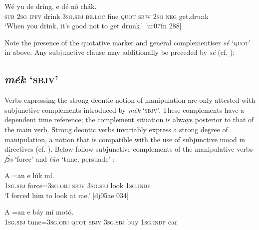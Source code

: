 \ea%
    \label{ex:key:1396}
    \gll Wé  yu  de  dríng,  e    dé          nó  chák.\\
\textsc{sub}  \textsc{2sg}  \textsc{ipfv}  drink  \textsc{3sg.sbj}  \textsc{be.loc}  fine    \textsc{quot}    \textsc{sbjv}    \textsc{2sg}  \textsc{neg}  get.drunk\\

\glt ‘When you drink, it’s good not to get drunk.’ [ur07fn 288]
\z

Note the presence of the quotative marker and general complementiser \textit{sé} ‘\textsc{quot}’ in  above. Any subjunctive clause may additionally be preceded by \textit{sé} (cf. ):

\subsection{\textit{mék} ‘\textsc{sbjv}’} \label{sec:10.5.5}

Verbs expressing the strong deontic notion of manipulation are only attested with subjunctive complements introduced by \textit{mék} ‘\textsc{sbjv}’. These complements have a dependent time reference; the complement situation is always posterior to that of the main verb. Strong deontic verbs invariably express a strong degree of manipulation, a notion that is compatible with the use of subjunctive mood in directives (cf. ). Below follow subjunctive complements of the manipulative verbs \textit{fɔ́s} ‘force’  and \textit{tún} ‘tune; persuade’ :


\ea%
    \label{ex:key:1397}
    \gll \MakeUppercase{A}   =an        e    lúk    mí.\\
\textsc{1sg.sbj}  force=\textsc{3sg.obj}  \textsc{sbjv}    \textsc{3sg.sbj}  look    \textsc{1sg.indp}\\

\glt ‘I forced him to look at me.’ [dj05ae 034]
\z


\ea%
    \label{ex:key:1398}
    \gll \MakeUppercase{A}   =an           e    báy    mí    motó.\\
\textsc{1sg.sbj}  tune=\textsc{3sg.obj}  \textsc{quot}    \textsc{sbjv}    \textsc{3sg.sbj}  buy    \textsc{1sg.indp}  car\\

